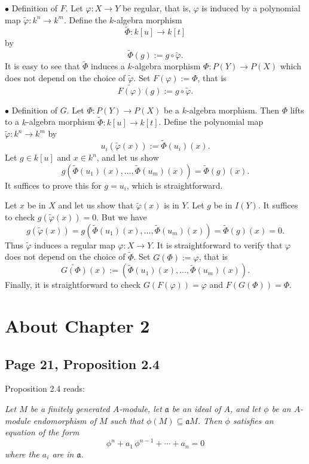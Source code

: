 \documentclass[parskip=half,fontsize=12pt]{scrartcl}%
\newcommand{\mf}{\mathfrak}
\begin{document}
$\bullet$ Definition of $F$. Let $\varphi:X\to Y$ be regular, that is, $\varphi$ is induced by a polynomial map $\widetilde\varphi:k^n\to k^m$. Define the $k$-algebra morphism 
$$
\widetilde\Phi:k[u]\to k[t]
$$ 
by 
$$
\widetilde\Phi(g):=g\circ \widetilde\varphi.
$$ 
It is easy to see that $\widetilde\Phi$ induces a $k$-algebra morphism $\Phi:P(Y)\to P(X)$ which does not depend on the choice of $\widetilde\varphi$. Set $F(\varphi):=\Phi$, that is 
$$
\widetilde{F(\varphi)}(g):=g\circ\widetilde\varphi.
$$ 

$\bullet$ Definition of $G$. Let $\Phi:P(Y)\to P(X)$ be a $k$-algebra morphism. Then $\Phi$ lifts to a $k$-algebra morphism $\widetilde\Phi:k[u]\to k[t]$. Define the polynomial map $\widetilde\varphi:k^n\to k^m$ by 
$$
u_i(\widetilde\varphi(x)):=\widetilde\Phi(u_i)(x).
$$ 
Let $g\in k[u]$ and $x\in k^n$, and let us show 
$$%
g\left(\widetilde\Phi(u_1)(x),\dots,\widetilde\Phi(u_m)(x)\right)=\widetilde\Phi(g)(x).
$$%
It suffices to prove this for $g=u_i$, which is straightforward. 

Let $x$ be in $X$ and let us show that $\widetilde\varphi(x)$ is in $Y$. Let $g$ be in $I(Y)$. It suffices to check $g(\widetilde\varphi(x))=0$. But we have 
$$
g\left(\widetilde\varphi(x)\right)=g\left(\widetilde\Phi(u_1)(x),\dots,\widetilde\Phi(u_m)(x)\right)=\widetilde\Phi(g)(x)=0.
$$ 
Thus $\widetilde\varphi$ induces a regular map $\varphi:X\to Y$. It is straightforward to verify that $\varphi$ does not depend on the choice of $\widetilde\Phi$. Set $G(\Phi):=\varphi$, that is 
$$
\widetilde{G(\Phi)}(x):=\left(\widetilde\Phi(u_1)(x),\dots,\widetilde\Phi(u_m)(x)\right).
$$ 
Finally, it is straightforward to check $G(F(\varphi))=\varphi$ and $F(G(\Phi))=\Phi$.

\section{About Chapter 2}%

\subsection{Page 21, Proposition 2.4}\label{24}%

Proposition 2.4 reads:

\emph{Let $M$ be a finitely generated $A$-module, let $\mf a$ be an ideal of $A$, and let $\phi$ be an $A$-module endomorphism of $M$ such that $\phi(M)\subseteq\mf a M$. Then $\phi$ satisfies an equation of the form
$$
\phi^n+a_1\,\phi^{n-1}+\cdots+a_n=0
$$ 
where the $a_i$ are in $\mf a$.}
\end{document}
